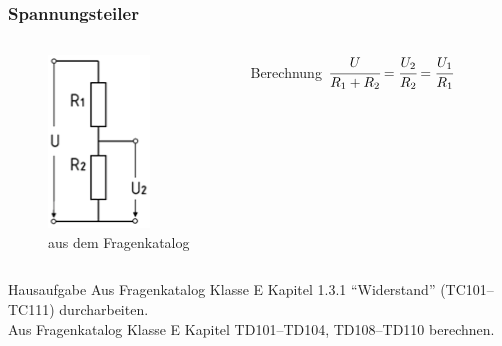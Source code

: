 \begin{frame}
  \frametitle{Spannungsteiler}
  \begin{columns}
    \begin{center}
      \begin{figure}
        \includegraphics[width=.6\textwidth,height=.75\textheight,keepaspectratio]{e04/Spannungsteiler.png}
        \caption{aus dem Fragenkatalog}
      \end{figure}
    \end{center}
    \begin{block}{Berechnung}
      $\cfrac{U}{R_1 + R_2} = \cfrac{U_2}{R_2} = \cfrac{U_1}{R_1}$
    \end{block}
  \end{columns}
\end{frame}


\begin{frame}
  \begin{alertblock}{Hausaufgabe}
    Aus Fragenkatalog Klasse E Kapitel 1.3.1 ``Widerstand'' (TC101--TC111) durcharbeiten.\\
    Aus Fragenkatalog Klasse E Kapitel TD101--TD104, TD108--TD110 berechnen.
  \end{alertblock}
\end{frame}

